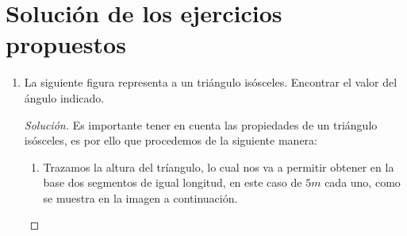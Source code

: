 \documentclass[12pt]{article}
\begin{document}
\section{Soluci\'on de los ejercicios propuestos}
\begin{enumerate}[leftmargin=*]
    \item  La siguiente figura representa a un tri\'angulo is\'osceles. Encontrar el valor del \'angulo indicado.
    \begin{center}
\end{center}
    \begin{proof}[Soluci\'on]
        Es importante tener en cuenta las propiedades de un tri\'angulo is\'osceles, es por ello que procedemos de la siguiente manera:
        \begin{enumerate}
            \item Trazamos la altura del tr\'iangulo, lo cual nos va a permitir obtener en la base dos segmentos de igual longitud, en este caso de $5m$ cada uno, como se muestra en la imagen a continuaci\'on.
            \begin{center}
\end{center}
\end{enumerate}
\end{proof}
\end{enumerate}
\end{document}
